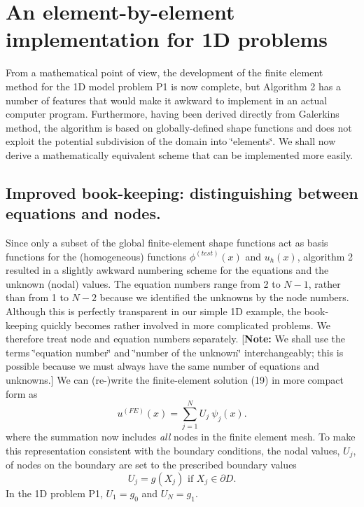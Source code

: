\hypertarget{index_implementation}{}\section{An element-\/by-\/element implementation for 1\+D problems}\label{index_implementation}
From a mathematical point of view, the development of the finite element method for the 1D model problem P1 is now complete, but Algorithm 2 has a number of features that would make it awkward to implement in an actual computer program. Furthermore, having been derived directly from Galerkin\textquotesingle{}s method, the algorithm is based on globally-\/defined shape functions and does not exploit the potential subdivision of the domain into \char`\"{}elements\char`\"{}. We shall now derive a mathematically equivalent scheme that can be implemented more easily.\hypertarget{index_book_keeping}{}\subsection{Improved book-\/keeping\+: distinguishing between equations and nodes.}\label{index_book_keeping}
Since only a subset of the global finite-\/element shape functions act as basis functions for the (homogeneous) functions $ \phi^{(test)}(x)$ and $ u_h(x)$, algorithm 2 resulted in a slightly awkward numbering scheme for the equations and the unknown (nodal) values. The equation numbers range from 2 to $N-1$, rather than from 1 to $N-2$ because we identified the unknowns by the node numbers. Although this is perfectly transparent in our simple 1D example, the book-\/keeping quickly becomes rather involved in more complicated problems. We therefore treat node and equation numbers separately. \mbox{[}{\bfseries Note\+:} We shall use the terms \char`\"{}equation number\char`\"{} and \char`\"{}number of the unknown\char`\"{} interchangeably; this is possible because we must always have the same number of equations and unknowns.\mbox{]} We can (re-\/)write the finite-\/element solution (19) in more compact form as \[ u^{(FE)}(x) =\sum_{j=1}^{N} U_j \ \psi_j(x). \] where the summation now includes {\itshape all} nodes in the finite element mesh. To make this representation consistent with the boundary conditions, the nodal values, $U_j$, of nodes on the boundary are set to the prescribed boundary values \[ U_j = g(X_j) \mbox{\ \ \ if $X_j\in \partial D$}.\] In the 1D problem P1, $U_1=g_0$ and $U_N=g_1$.

